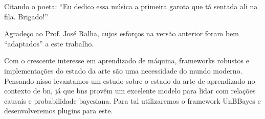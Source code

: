 \documentclass[qualificacao,bacharelado,ppca]{UnB-CIC}%
\begin{document}
  \maketitle

  \begin{dedicatoria}
Citando o poeta: ``Eu dedico essa música a primeira garota que tá sentada ali na fila. Brigado!''
  \end{dedicatoria}

  \begin{agradecimentos}
Agradeço ao Prof. José Ralha, cujos esforços na versão anterior foram bem ``adaptados'' a este trabalho.
  \end{agradecimentos}


  \begin{resumo}
	Com o crescente interesse em aprendizado de máquina, frameworks robustos e implementações do estado da arte são uma necessidade do mundo moderno. Pensando nisso levantamos um estudo sobre o estado da arte de aprendizado no contexto de \gls{bn}, já que \glspl{bn} provêm um excelente modelo para lidar com relações causais e probabilidade bayesiana. Para tal utilizaremos o framework UnBBayes e desenvolveremos plugins para este.
  \end{resumo}
  

  \begin{abstract}
  With the growing interest in machine learning, good frameworks and state of the art implementation are a need in modern world. With this in mind we provide a study in the state of the art of \gls{bn}, since \glspl{bn} provide a great model to deal with causal relations and bayesian probability. For such we shall use UnBBayes framework and implement plugins for it.
  \end{abstract}

  \tableofcontents
  \listoffigures
  \listoftables
  \printnoidxglossaries
\renewcommand{\appendixname}{Anexo}


  \textual
  
  
  
  
  
  
  
  
  

  \postextual
  
  

\appendix
\end{document}
